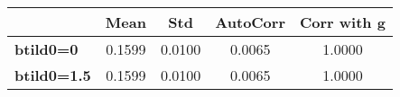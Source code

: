 \begin{tiny}\begin{tabular}{|l|c|c|c|c|}
\hline
&\textbf{Mean}&\textbf{Std}&\textbf{AutoCorr}&\textbf{Corr with g}\\\hline
\textbf{btild0=0}&0.1599&0.0100&0.0065&1.0000\\\hline
\textbf{btild0=1.5}&0.1599&0.0100&0.0065&1.0000\\\hline
\end{tabular}
\end{tiny}